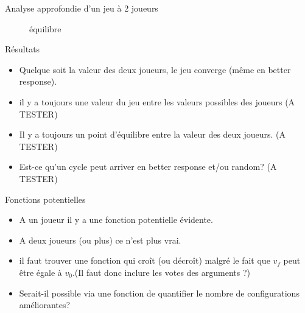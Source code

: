 \documentclass{beamer}
\begin{document}
\begin{frame}{Analyse approfondie d'un jeu à 2 joueurs}
\begin{minipage}{.5\linewidth}
    \begin{figure}
    \centering
    \caption{équilibre}
    \end{figure}
    \end{minipage}
  \end{frame}

  \begin{frame}{Résultats}
    \begin{itemize}
      \item Quelque soit la valeur des deux joueurs, le jeu converge (même en better response).
      \item il y a toujours une valeur du jeu entre les valeurs possibles des joueurs (A TESTER)
      \item Il y a toujours un point d'équilibre entre la valeur des deux joueurs. (A TESTER)
    \end{itemize}

    \begin{itemize}
      \item Est-ce qu'un cycle peut arriver en better response et/ou random? (A TESTER)
    \end{itemize}
  \end{frame}

  \begin{frame}{Fonctions potentielles}
    \begin{itemize}
      \item A un joueur il y a une fonction potentielle évidente.
      \item A deux joueurs (ou plus) ce n'est plus vrai.
      \item il faut trouver une fonction qui croît (ou décroît) malgré le fait que $v_f$ peut être égale à $v_0$.(Il faut donc inclure les votes des arguments ?)
      \item Serait-il possible via une fonction de quantifier le nombre de configurations améliorantes?
    \end{itemize}


  \end{frame}
\end{document}
